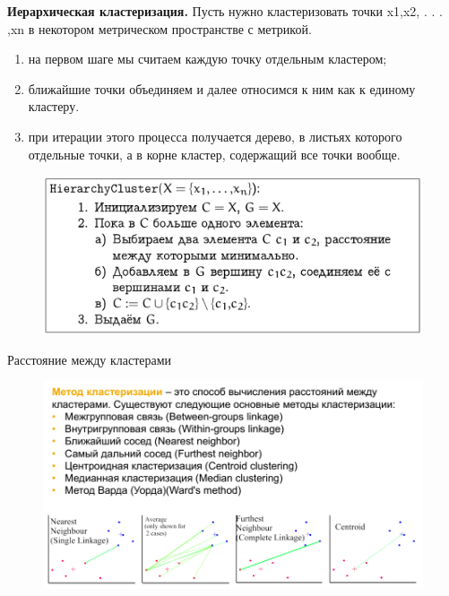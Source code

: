 \documentclass{beamer}
\begin{document}
\begin{frame}
\textbf{Иерархическая кластеризация.} Пусть нужно кластеризовать точки x1,x2, . . . ,xn в некотором метрическом пространстве с метрикой.
\begin{enumerate}
\item на первом шаге мы считаем каждую точку отдельным кластером;
\item ближайшие точки объединяем и далее относимся к ним как к единому кластеру.
\item при итерации этого процесса получается дерево, в листьях которого  отдельные точки, а в корне  кластер, содержащий все точки вообще.
\end{enumerate}
\begin{figure}[h]
\centering
\includegraphics[scale=0.4]{images/lec07-pic16.png}
\end{figure}
\end{frame}

\begin{frame}{Расстояние между кластерами}
	\begin{figure}[h]
		\centering
		\includegraphics[scale=0.5]{images/lec07-pic17.png}
	\end{figure}
\end{frame}
\end{document}
